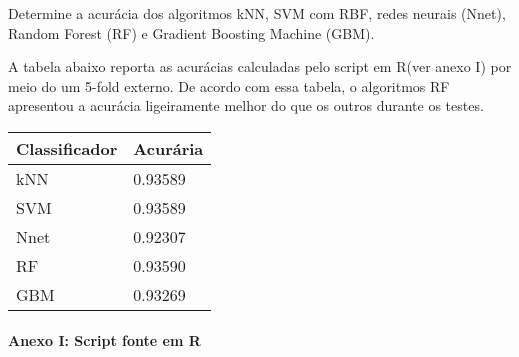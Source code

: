 \documentclass[10pt, a4paper]{exam}
\begin{document}
	\renewcommand{\solutiontitle}{\noindent\textbf{Solução:}\enspace}
	\bracketedpoints
	\setlength\linefillheight{.6cm} %
	
%
%	
\pagestyle{headandfoot}
\chead{}

\lfoot{}
\rfoot{}
	\vspace{0.1in}
	\printanswers
	
	\begin{questions}	    
	    \question
	    Determine a acurácia dos algoritmos kNN, SVM com RBF, redes neurais (Nnet), Random Forest (RF) e Gradient Boosting Machine (GBM).
	    \begin{solution}
	    
	    A tabela abaixo reporta as acurácias calculadas pelo script em R(ver anexo I) por meio do um 5-fold	externo. De acordo com essa tabela, o algoritmos RF apresentou a acurácia ligeiramente melhor do que os outros durante os testes.
		\begin{center}
	
			\begin{tabular}{@{} p{2cm}  p{2cm}@{}}
      			\toprule
	  			\textbf{Classificador} & \textbf{Acurária} \\ 
	  			\midrule
				kNN & 0.93589\\  
				\midrule
				SVM & 0.93589\\ 
				\midrule
				Nnet & 0.92307\\ 
				\midrule
				RF & 0.93590\\
				\midrule
				GBM & 0.93269\\
	  			\bottomrule
      		\end{tabular}
		\end{center}	
		
		\end{solution}
	  
	  
		\paragraph{Anexo I: Script fonte em R}
		\paragraph{}
		

		\end{questions}
		
\end{document}
